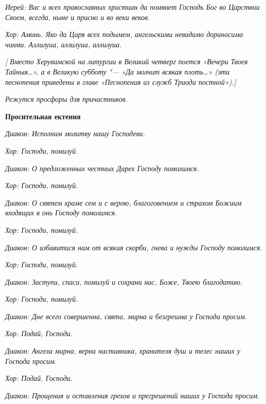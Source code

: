  \itshape Иерей:\normalfont{} Вас и всех православных христиан да помянет Господь Бог во
Царствии Своем, всегда, ныне и присно и во веки веков.


 \itshape Хор:\normalfont{} Аминь. Яко да Царя всех подымем, ангельскими невидимо
дориносима чинми. Аллилуиа, аллилуиа, аллилуиа.


 \itshape [ Вместо Херувимской на литургии в Великий четверг поется\normalfont{} «Вечери
Твоея Тайныя…», \itshape а в Великую субботу "--- \normalfont{} «Да молчит всякая плоть…»
\itshape (эти песнопения приведены в главе «Песнопения из служб Триоди
постной»).]\normalfont{}


 \itshape Режутся просфоры для причастников\normalfont{}.



 

\bfseries Просительная ектения\normalfont{}


 \itshape Диакон:\normalfont{} Исполним молитву нашу Господеви.


 \itshape Хор:\normalfont{} Господи, помилуй.


 \itshape Диакон:\normalfont{} О предложенных честных Дарех Господу помолимся.


 \itshape Хор:\normalfont{} Господи, помилуй.


 \itshape Диакон:\normalfont{} О святем храме сем и с верою, благоговением и страхом Божиим
входящих в онь Господу помолимся.


 \itshape Хор:\normalfont{} Господи, помилуй.


 \itshape Диакон:\normalfont{} О избавитися нам от всякия скорби, гнева и нужды Господу
помолимся.


 \itshape Хор:\normalfont{} Господи, помилуй.


 \itshape Диакон:\normalfont{} Заступи, спаси, помилуй и сохрани нас, Боже, Твоею
благодатию.


 \itshape Хор:\normalfont{} Господи, помилуй.


 \itshape Диакон:\normalfont{} Дне всего совершенна, свята, мирна и безгрешна у Господа
просим.



 \itshape Хор:\normalfont{} Подай, Господи.


 \itshape Диакон:\normalfont{} Ангела мирна, верна наставника, хранителя душ и телес наших у
Господа просим.


 \itshape Хор:\normalfont{} Подай, Господи.


 \itshape Диакон:\normalfont{} Прощения и оставления грехов и прегрешений наших у Господа
просим.



